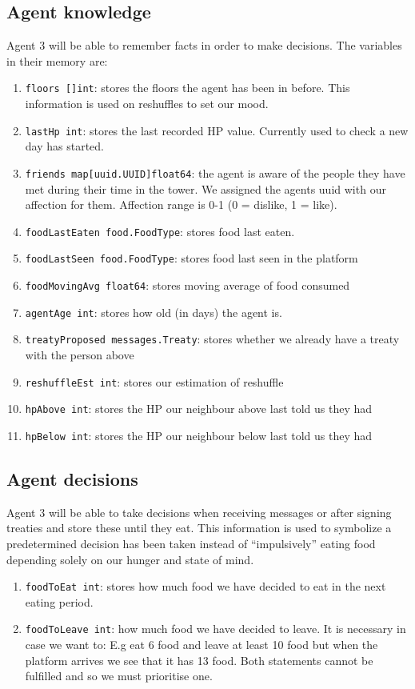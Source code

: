 \subsection{Agent knowledge}
Agent 3 will be able to remember facts in order to make decisions. The variables in their memory are:
\begin{enumerate}
    \item \texttt{floors []int}: stores the floors the agent has been in before. This information is used on reshuffles to set our mood. 
    \item \texttt{lastHp int}: stores the last recorded HP value. Currently used to check a new day has started.
    \item \texttt{friends map[uuid.UUID]float64}: the agent is aware of the people they have met during their time in the tower. We assigned the agents uuid with our affection for them. Affection range is 0-1 (0 = dislike, 1 = like). 
    \item \texttt{foodLastEaten food.FoodType}: stores food last eaten.
    \item \texttt{foodLastSeen food.FoodType}: stores food last seen in the platform
    \item \texttt{foodMovingAvg float64}: stores moving average of food consumed
    \item \texttt{agentAge int}: stores how old (in days) the agent is.
    \item \texttt{treatyProposed messages.Treaty}: stores whether we already have a treaty with the person above
    \item \texttt{reshuffleEst int}: stores our estimation of reshuffle
    \item \texttt{hpAbove int}: stores the HP our neighbour above last told us they had
    \item \texttt{hpBelow int}: stores the HP our neighbour below last told us they had
  \end{enumerate}

\subsection{Agent decisions}
Agent 3 will be able to take decisions when receiving messages or after signing treaties and store these until they eat. This information is used to symbolize a predetermined decision has been taken instead of “impulsively” eating food depending solely on our hunger and state of mind.
\begin{enumerate}
    \item \texttt{foodToEat int}: stores how much food we have decided to eat in the next eating period.
    \item \texttt{foodToLeave int}: how much food we have decided to leave. It is necessary in case we want to: E.g eat 6 food and leave at least 10 food but when the platform arrives we see that it has 13 food. Both statements cannot be fulfilled and so we must prioritise one.
\end{enumerate}

